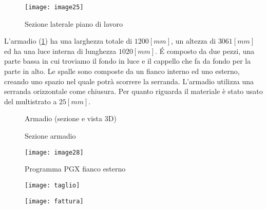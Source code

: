 \begin{figure}[H]
	\centering
	\texttt{[image: image25]}
	\caption{Sezione laterale piano di lavoro}
\end{figure}

\noindent
L'armadio (\cref{fig:armadio}) ha una larghezza totale di $1200 [mm]$, un altezza di $3061 [mm]$ ed ha  una luce interna di  lunghezza $1020 [mm]$. É composto da  due pezzi, una parte bassa in cui troviamo il fondo in luce e il cappello che fa da fondo per la parte in alto. Le spalle sono composte da un fianco interno ed uno esterno, creando uno spazio nel quale potrà scorrere la serranda. L'armadio utilizza una serranda orizzontale come chiusura. Per quanto riguarda il materiale  è stato usato del multistrato a $25[mm]$.

\begin{figure}[H]
	\captionsetup[subfloat]{farskip=2pt,captionskip=8pt}
	\centering
	\hspace{1cm}
	
	\caption{Armadio (sezione e vista 3D)}
	\label{fig:armadio}
\end{figure}

\begin{figure}[H]
	
	\captionsetup[subfloat]{farskip=2pt,captionskip=8pt}
	\centering
	\hspace{1cm}
	
	\caption{Sezione armadio}
	\label{fig:imagesizes}
\end{figure}


\begin{figure}[H]
	\centering
	\texttt{[image: image28]}
	\caption{Programma PGX fianco esterno}
	\label{fig:mesh1}
\end{figure}


\begin{figure}[H]
	\centering
	\texttt{[image: taglio]}

\end{figure}

\begin{figure}[H]
	\centering
	\texttt{[image: fattura]}

\end{figure}

